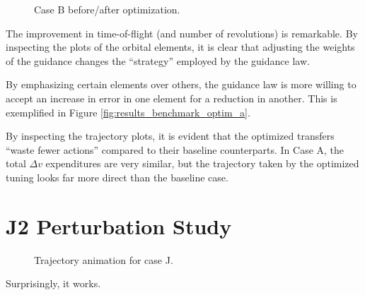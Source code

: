 \begin{figure}[H]
    \begin{animateinline}[controls,width=\linewidth, loop]{10}
    \end{animateinline}
    \caption{Case B before/after optimization.}
    \label{fig:g_optim_anim}
\end{figure}

The improvement in time-of-flight (and number of revolutions) is remarkable. By inspecting the plots of the orbital elements, it is clear that adjusting the weights of the guidance changes the ``strategy'' employed by the guidance law.

By emphasizing certain elements over others, the guidance law is more willing to accept an increase in error in one element for a reduction in another. This is exemplified in Figure \ref{fig:results_benchmark_optim_a}.

By inspecting the trajectory plots, it is evident that the optimized transfers ``waste fewer actions'' compared to their baseline counterparts. In Case A, the total \(\Delta v\) expenditures are very similar, but the trajectory taken by the optimized tuning looks far more direct than the baseline case.


\section{J2 Perturbation Study}

\begin{figure}[H]
    \caption{Trajectory animation for case J.}
    \label{fig:anim_j}
\end{figure}

Surprisingly, it works.

